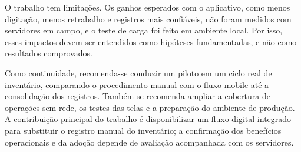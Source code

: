 \documentclass[12pt,a4paper]{article}
\begin{document}
O trabalho tem limitações. Os ganhos esperados com o aplicativo, como menos digitação, menos retrabalho e registros mais confiáveis, não foram medidos com servidores em campo, e o teste de carga foi feito em ambiente local. Por isso, esses impactos devem ser entendidos como hipóteses fundamentadas, e não como resultados comprovados.

Como continuidade, recomenda-se conduzir um piloto em um ciclo real de inventário, comparando o procedimento manual com o fluxo mobile até a consolidação dos registros. Também se recomenda ampliar a cobertura de operações sem rede, os testes das telas e a preparação do ambiente de produção. A contribuição principal do trabalho é disponibilizar um fluxo digital integrado para substituir o registro manual do inventário; a confirmação dos benefícios operacionais e da adoção depende de avaliação acompanhada com os servidores.
\end{document}
